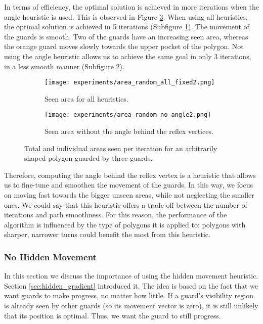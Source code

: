 In terms of efficiency, the optimal solution is achieved in more iterations when the angle heuristic is used. This is observed in Figure \ref{fig:no_angle_plots}. When using all heuristics, the optimal solution is achieved in 5 iterations (Subfigure \ref{fig:area_all_angle}). The movement of the guards is smooth. Two of the guards have an increasing seen area, whereas the orange guard moves slowly towards the upper pocket of the polygon. Not using the angle heuristic allows us to achieve the same goal in only 3 iterations, in a less smooth manner (Subfigure \ref{fig:area_no_angle}).

\begin{figure}[h!]
    \begin{subfigure}{0.45\textwidth}
        \texttt{[image: experiments/area\_random\_all\_fixed2.png]}
        \caption{Seen area for all heuristics.}
        \label{fig:area_all_angle}
    \end{subfigure}
    \hfill
    \begin{subfigure}{0.45\textwidth}
        \texttt{[image: experiments/area\_random\_no\_angle2.png]}
        \caption{Seen area without the angle behind the reflex vertices.}
        \label{fig:area_no_angle}
    \end{subfigure}
    \caption{Total and individual areas seen per iteration for an arbitrarily shaped polygon guarded by three guards.}
    \label{fig:no_angle_plots}
\end{figure}

Therefore, computing the angle behind the reflex vertex is a heuristic that allows us to fine-tune and smoothen the movement of the guards. In this way, we  focus on moving fast towards the bigger unseen areas, while not neglecting the smaller ones. We could say that this heuristic offers a trade-off between the number of iterations and path smoothness. For this reason, the performance of the algorithm is influenced by the type of polygons it is applied to: polygons with sharper, narrower turns could benefit the most from this heuristic.


\subsubsection{No Hidden Movement}
In this section we  discuss the importance of using the hidden movement heuristic. Section \ref{sec:hidden_gradient} introduced it. The idea is based on the fact that we want guards to make progress, no matter how little. If a guard's visibility region is already seen by other guards (so its movement vector is zero), it is still unlikely that its position is optimal. Thus, we want the guard to still progress.

